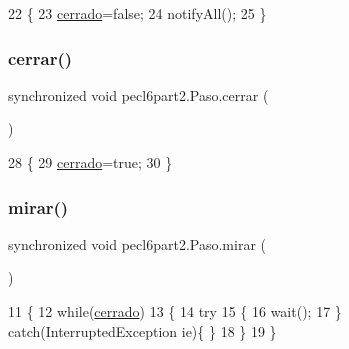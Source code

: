 \begin{DoxyCode}
22     \{
23         \mbox{\hyperlink{classpecl6part2_1_1_paso_a85e74043053dddfb00933f2982980d19}{cerrado}}=\textcolor{keyword}{false};
24         notifyAll();
25     \}
\end{DoxyCode}
\mbox{\label{classpecl6part2_1_1_paso_a3868cf1f106bb5b195ea9a7e44c3644a}} 
\subsubsection{\texorpdfstring{cerrar()}{cerrar()}}
{\footnotesize\ttfamily synchronized void pecl6part2.\+Paso.\+cerrar (\begin{DoxyParamCaption}{ }\end{DoxyParamCaption})\hspace{0.3cm}{\ttfamily [inline]}}


\begin{DoxyCode}
28     \{
29         \mbox{\hyperlink{classpecl6part2_1_1_paso_a85e74043053dddfb00933f2982980d19}{cerrado}}=\textcolor{keyword}{true};
30     \}
\end{DoxyCode}
\mbox{\label{classpecl6part2_1_1_paso_a374d70af70d81631660741eb340af6ce}} 
\subsubsection{\texorpdfstring{mirar()}{mirar()}}
{\footnotesize\ttfamily synchronized void pecl6part2.\+Paso.\+mirar (\begin{DoxyParamCaption}{ }\end{DoxyParamCaption})\hspace{0.3cm}{\ttfamily [inline]}}


\begin{DoxyCode}
11     \{
12         \textcolor{keywordflow}{while}(\mbox{\hyperlink{classpecl6part2_1_1_paso_a85e74043053dddfb00933f2982980d19}{cerrado}})
13         \{
14             \textcolor{keywordflow}{try}
15             \{
16                 wait();
17             \} \textcolor{keywordflow}{catch}(InterruptedException ie)\{ \}
18         \}
19     \}
\end{DoxyCode}


